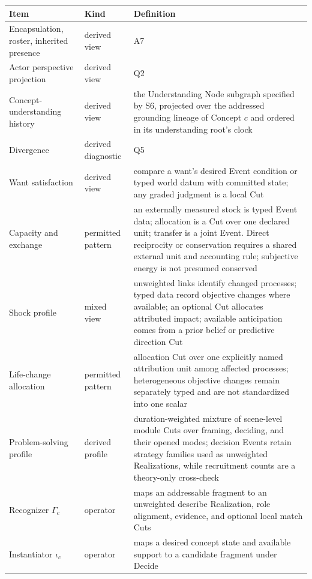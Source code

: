 \documentclass[11pt,a4paper]{article}
\begin{document}
\begin{center}
\footnotesize
\begin{tabularx}{\textwidth}{@{}p{}p{}Y@{}}
\toprule
Item & Kind & Definition \\
\midrule
Encapsulation, roster, inherited presence & derived view & A7 \\
Actor perspective projection & derived view & Q2 \\
Concept-understanding history & derived view & the Understanding Node subgraph specified by S6, projected over the addressed grounding lineage of Concept $c$ and ordered in its understanding root's clock \\
Divergence & derived diagnostic & Q5 \\
Want satisfaction & derived view & compare a want's desired Event condition or typed world datum with committed state; any graded judgment is a local Cut \\
Capacity and exchange & permitted pattern & an externally measured stock is typed Event data; allocation is a Cut over one declared unit; transfer is a joint Event. Direct reciprocity or conservation requires a shared external unit and accounting rule; subjective energy is not presumed conserved \\
Shock profile & mixed view & unweighted links identify changed processes; typed data record objective changes where available; an optional Cut allocates attributed impact; available anticipation comes from a prior belief or predictive direction Cut \\
Life-change allocation & permitted pattern & allocation Cut over one explicitly named attribution unit among affected processes; heterogeneous objective changes remain separately typed and are not standardized into one scalar \\
Problem-solving profile & derived profile & duration-weighted mixture of scene-level module Cuts over framing, deciding, and their opened modes; decision Events retain strategy families used as unweighted Realizations, while recruitment counts are a theory-only cross-check \\
Recognizer $\Gamma_c$ & operator & maps an addressable fragment to an unweighted \textsf{describe} Realization, role alignment, evidence, and optional local match Cuts \\
Instantiator $\iota_c$ & operator & maps a desired concept state and available support to a candidate fragment under Decide \\
\bottomrule
\end{tabularx}
\end{center}
\end{document}
